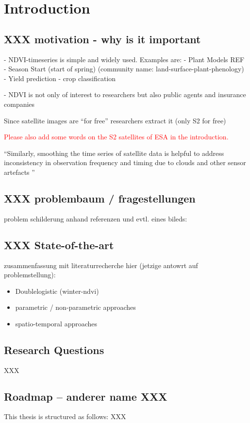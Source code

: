 \chapter{Introduction}

\section{XXX motivation - why is it important}{
    - NDVI-timeseries is simple and widely used. 
        Examples are: 
            - Plant Models REF
            - Season Start (start of spring) (community name: land-surface-plant-phenology)
            - Yield prediction
            - crop classification
    
    - NDVI is not only of interest to researchers but also public agents and insurance companies
    
    Since satellite images are ``for free'' researchers extract it (only S2 for free)
    
    \textcolor{red}{Please also add some words on the S2 satellites of ESA in the introduction.} 

    ``Similarly, smoothing the time series of satellite data is helpful to address inconsistency in observation frequency and timing due to clouds and other sensor artefacts \cite{skakunWinterWheatYield2019}''
}


\section{XXX problembaum / fragestellungen}{
    problem schilderung anhand referenzen und evtl. eines bileds:
}



\section{XXX State-of-the-art}{
    zusammenfassung mit literaturrecherche hier (jetzige antowrt auf problemstellung):
    \begin{itemize}
        \item Doublelogistic (winter-ndvi)
        \item parametric / non-parametric approaches
        \item spatio-temporal approaches
    \end{itemize}
}

\section{Research Questions}
XXX

\section{Roadmap -- anderer name XXX}{
    This thesis is structured as follows: XXX
}








